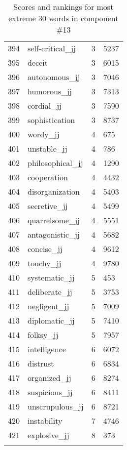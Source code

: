 \begin{longtable}[!htbp]{| rlr@{.}l |}
    394 & self-critical\_jj & 3 & 5237 \\
    395 & deceit & 3 & 6015 \\
    396 & autonomous\_jj & 3 & 7046 \\
    397 & humorous\_jj & 3 & 7313 \\
    398 & cordial\_jj & 3 & 7590 \\
    399 & sophistication & 3 & 8737 \\
    400 & wordy\_jj & 4 & 675 \\
    401 & unstable\_jj & 4 & 786 \\
    402 & philosophical\_jj & 4 & 1290 \\
    403 & cooperation & 4 & 4432 \\
    404 & disorganization & 4 & 5403 \\
    405 & secretive\_jj & 4 & 5499 \\
    406 & quarrelsome\_jj & 4 & 5551 \\
    407 & antagonistic\_jj & 4 & 5682 \\
    408 & concise\_jj & 4 & 9612 \\
    409 & touchy\_jj & 4 & 9780 \\
    410 & systematic\_jj & 5 & 453 \\
    411 & deliberate\_jj & 5 & 3753 \\
    412 & negligent\_jj & 5 & 7009 \\
    413 & diplomatic\_jj & 5 & 7410 \\
    414 & folksy\_jj & 5 & 7957 \\
    415 & intelligence & 6 & 6072 \\
    416 & distrust & 6 & 6834 \\
    417 & organized\_jj & 6 & 8274 \\
    418 & suspicious\_jj & 6 & 8411 \\
    419 & unscrupulous\_jj & 6 & 8721 \\
    420 & instability & 7 & 4746 \\
    421 & explosive\_jj & 8 & 373 \\
    \hline
    \caption{Scores and rankings for most extreme 30 words in component \#13} \\
\end{longtable}
